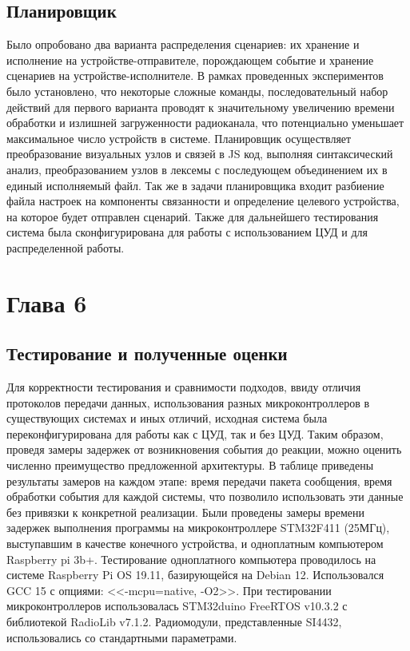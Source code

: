 \documentclass[14pt, a4paper]{extreport}
\begin{document}
\section{Планировщик}
Было опробовано два варианта распределения сценариев: их хранение и исполнение на устройстве-отправителе, порождающем событие и хранение сценариев на устройстве-исполнителе. В рамках проведенных экспериментов было установлено, что некоторые сложные команды, последовательный набор действий для первого варианта проводят к значительному увеличению времени обработки и излишней загруженности радиоканала, что потенциально уменьшает максимальное число устройств в системе.
Планировщик осуществляет преобразование визуальных узлов и связей в JS код, выполняя синтаксический анализ, преобразованием узлов в лексемы с последующем объединением их в единый исполняемый файл. Так же в задачи планировщика входит разбиение файла настроек на компоненты связанности и определение целевого устройства, на которое будет отправлен сценарий.
Также для дальнейшего тестирования система была сконфигурирована для работы с использованием ЦУД и для распределенной работы.

\newpage

\chapter{Глава 6}

\section{Тестирование и полученные оценки}

Для корректности тестирования и сравнимости подходов, ввиду отличия протоколов передачи данных, использования разных
микроконтроллеров в существующих системах и иных отличий, исходная система была переконфигурирована для работы как с
ЦУД, так и без ЦУД. Таким образом, проведя замеры задержек от возникновения события до реакции, можно оценить численно
преимущество предложенной архитектуры. В таблице приведены результаты замеров на каждом этапе: время передачи
пакета сообщения, время обработки события для каждой системы, что позволило использовать эти данные без привязки к
конкретной реализации. Были проведены замеры времени задержек выполнения программы на микроконтроллере STM32F411
(25МГц), выступавшим в качестве конечного устройства, и одноплатным компьютером Raspberry pi 3b+. Тестирование
одноплатного компьютера проводилось на системе Raspberry Pi OS 19.11, базирующейся на Debian 12. Использовался GCC 15
с опциями: <<-mcpu=native, -O2>>. При тестировании микроконтроллеров использовалась STM32duino FreeRTOS v10.3.2 с
библиотекой RadioLib v7.1.2. Радиомодули, представленные SI4432, использовались со стандартными параметрами.
\end{document}
